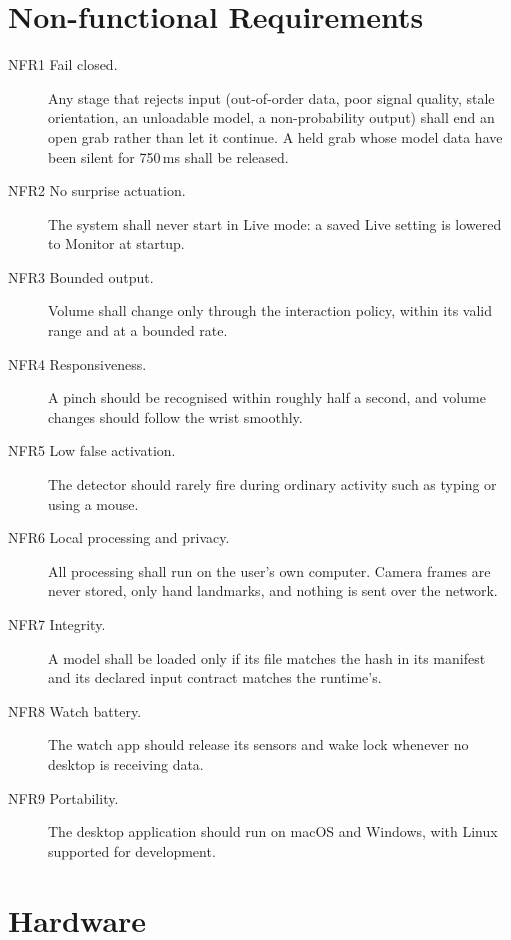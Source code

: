 \section{Non-functional Requirements}

\begin{description}
\item[NFR1 Fail closed.] Any stage that rejects input (out-of-order data, poor signal quality, stale orientation, an unloadable model, a non-probability output) shall end an open grab rather than let it continue. A held grab whose model data have been silent for 750\,ms shall be released.
\item[NFR2 No surprise actuation.] The system shall never start in Live mode: a saved Live setting is lowered to Monitor at startup.
\item[NFR3 Bounded output.] Volume shall change only through the interaction policy, within its valid range and at a bounded rate.
\item[NFR4 Responsiveness.] A pinch should be recognised within roughly half a second, and volume changes should follow the wrist smoothly.
\item[NFR5 Low false activation.] The detector should rarely fire during ordinary activity such as typing or using a mouse.
\item[NFR6 Local processing and privacy.] All processing shall run on the user's own computer. Camera frames are never stored, only hand landmarks, and nothing is sent over the network.
\item[NFR7 Integrity.] A model shall be loaded only if its file matches the hash in its manifest and its declared input contract matches the runtime's.
\item[NFR8 Watch battery.] The watch app should release its sensors and wake lock whenever no desktop is receiving data.
\item[NFR9 Portability.] The desktop application should run on macOS and Windows, with Linux supported for development.
\end{description}

\section{Hardware}

